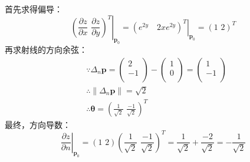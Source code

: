 首先求得偏导：
\[
\left. \left( \frac{\partial z}{\partial x}\,\,\frac{\partial z}{\partial y} \right) ^T \right|_{\boldsymbol{p}_0}=\left. \left( e^{2y} \quad 2xe^{2y} \right) ^T \right|_{\boldsymbol{p}_0}=\left( 1\,\,2 \right) ^T
\]
再求射线的方向余弦：
\begin{align*}
&\because \Delta _n\boldsymbol{p}=\left( \begin{array}{c}
	2\\
	-1\\
\end{array} \right) -\left( \begin{array}{c}
	1\\
	0\\
\end{array} \right) =\left( \begin{array}{c}
	1\\
	-1\\
\end{array} \right)
\\
&\therefore \left\| \Delta _n\boldsymbol{p} \right\| =\sqrt{2} \\
&\therefore \mathbf{\theta }=\left( \frac{1}{\sqrt{2}}\,\,\frac{-1}{\sqrt{2}} \right) ^T
\end{align*}
最终，方向导数：
\[
\left. \frac{\partial z}{\partial n} \right|_{\boldsymbol{p}_0}=\left( 1\,\,2 \right) \left( \frac{1}{\sqrt{2}}\,\,\frac{-1}{\sqrt{2}} \right) ^T=\frac{1}{\sqrt{2}}+\frac{-2}{\sqrt{2}}=-\frac{1}{\sqrt{2}}
\]




